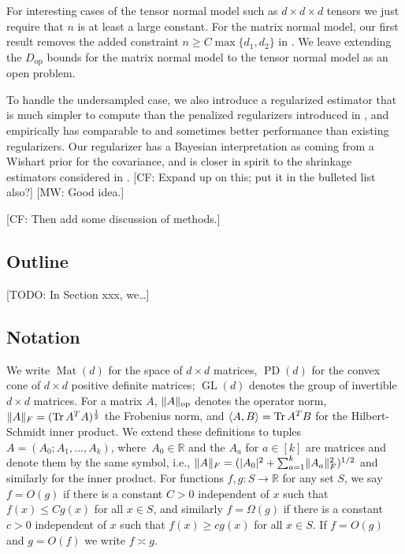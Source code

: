 \documentclass[aos]{imsart}
\theoremstyle{definition}
\numberwithin{equation}{section}
\DeclareMathOperator{\op}{op}
\DeclareMathOperator{\Mat}{Mat}
\DeclareMathOperator{\GL}{GL}
\DeclareMathOperator{\tr}{Tr}
\DeclareMathOperator{\PD}{PD}
\DeclarePairedDelimiter{\abs}{\lvert}{\rvert}
\DeclarePairedDelimiter{\norm}{\lVert}{\rVert}
\newcommand{\R}{{\mathbb{R}}}
\newcommand{\CF}[1]{{\color{purple}[CF: #1]}}
\newcommand{\MW}[1]{{\color{red}[MW: #1]}}
\newcommand{\TODO}[1]{{\color{blue}[TODO: #1]}}
\begin{document}
For interesting cases of the tensor normal model such as $d\times d \times d$ tensors we just require that $n$ is at least a large constant.
For the matrix normal model, our first result removes the added constraint $n \geq C \max\{d_1,d_2\}$ in \cite{tsiligkaridis2013convergence}.
We leave extending the $D_{\op}$ bounds for the matrix normal model to the tensor normal model as an open problem.

To handle the undersampled case, we also introduce a regularized estimator that is much simpler to compute than the penalized regularizers introduced in \cite{tsiligkaridis2013convergence,sun2015nonconvex,zhou2014gemini}, and empirically has comparable to and sometimes better performance than existing regularizers.
Our regularizer has a Bayesian interpretation as coming from a Wishart prior for the covariance, and is closer in spirit to the shrinkage estimators considered in \cite{goes2020robust}.
\CF{Expand up on this; put it in the bulleted list also?}
\MW{Good idea.}

\CF{Then add some discussion of methods.}

\subsection{Outline}
\TODO{In Section xxx, we\dots}

\subsection{Notation}
We write $\Mat(d)$ for the space of $d\times d$ matrices, $\PD(d)$ for the convex cone of $d\times d$ positive definite matrices; $\GL(d)$ denotes the group of invertible $d\times d$ matrices.
For a matrix $A$, $\norm{A}_{\op}$ denotes the operator norm, $\norm{A}_F = (\tr A^T A)^{\frac12}$ the Frobenius norm, and $\braket{A,B} = \tr A^T B$ for the Hilbert-Schmidt inner product.
We extend these definitions to tuples $A=(A_0;A_1,\dots,A_k)$, where~$A_0\in\R$ and the $A_a$ for $a\in[k]$ are matrices and denote them by the same symbol, i.e., $\norm{A}_F = (\abs{A_0}^2 + \sum_{a=1}^k \norm{A_a}_F^2)^{1/2}$ and similarly for the inner product. For functions $f,g:S \to \R$ for any set $S$, we say $f = O(g)$ if there is a constant $C > 0$ independent of $x$ such that $f(x) \leq C g(x)$ for all $x \in S$, and similarly $f = \Omega(g)$ if there is a constant $c > 0$ independent of $x$ such that $f(x) \geq c g(x)$ for all $x \in S$. If $f = O(g)$ and $g = O(f)$ we write $f \asymp g$.
\end{document}
